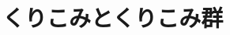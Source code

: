 \documentclass[unicode,a4paper,10pt]{ltjsarticle}
\begin{document}
\clearpage
\section{くりこみとくりこみ群}






















\clearpage



\nocite{Peskin:1995}
\nocite{Sato:2016}
\nocite{Mogi:2001}

\end{document}
